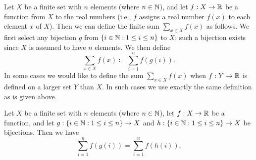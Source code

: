 \begin{defn}\label{7.1.6}
  Let \(X\) be a finite set with \(n\) elements (where \(n \in \mathbb{N}\)), and let \(f : X \to \mathbb{R}\) be a function from \(X\) to the real numbers
  (i.e., \(f\) assigns a real number \(f(x)\) to each element \(x\) of \(X\)).
  Then we can define the finite sum \(\sum_{x \in X} f(x)\) as follows.
  We first select any bijection \(g\) from \(\{i \in \mathbb{N} : 1 \leq i \leq n\}\) to \(X\);
  such a bijection exists since \(X\) is assumed to have \(n\) elements.
  We then define
  \[
    \sum_{x \in X} f(x) \coloneqq \sum_{i = 1}^n f(g(i)).
  \]
  In some cases we would like to define the sum \(\sum_{x \in X} f(x)\) when \(f : Y \to \mathbb{R}\) is defined on a larger set \(Y\) than \(X\).
  In such cases we use exactly the same definition as is given above.
\end{defn}

\setcounter{thm}{7}
\begin{prop}\label{7.1.8}
  Let \(X\) be a finite set with \(n\) elements (where \(n \in \mathbb{N}\)), let \(f : X \to \mathbb{R}\) be a function, and let \(g : \{i \in \mathbb{N} : 1 \leq i \leq n\} \to X\) and \(h : \{i \in \mathbb{N} : 1 \leq i \leq n\} \to X\) be bijections.
  Then we have
  \[
    \sum_{i = 1}^n f(g(i)) = \sum_{i = 1}^n f(h(i)).
  \]
\end{prop}

